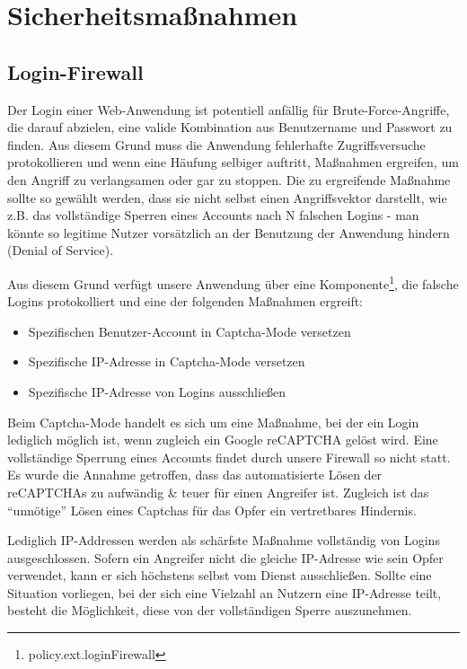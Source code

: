 \documentclass[12pt,DIV14,BCOR10mm,a4paper,parskip=half-,headsepline,headinclude,english,ngerman,bibliography=totocnumbered]{scrreprt}
\begin{document}
\chapter{Sicherheitsmaßnahmen}

\section{Login-Firewall}
Der Login einer Web-Anwendung ist potentiell anfällig für Brute-Force-Angriffe, die darauf abzielen, eine valide Kombination aus Benutzername und Passwort zu finden. Aus diesem Grund muss die Anwendung fehlerhafte Zugriffsversuche protokollieren und wenn eine Häufung selbiger auftritt, Maßnahmen ergreifen, um den Angriff zu verlangsamen oder gar zu stoppen. Die zu ergreifende Maßnahme sollte so gewählt werden, dass sie nicht selbst einen Angriffsvektor darstellt, wie z.B. das vollständige Sperren eines Accounts nach N falschen Logins - man könnte so legitime Nutzer vorsätzlich an der Benutzung der Anwendung hindern (Denial of Service).

Aus diesem Grund verfügt unsere Anwendung über eine Komponente\footnote{policy.ext.loginFirewall}, die falsche Logins protokolliert und eine der folgenden Maßnahmen ergreift:

\begin{itemize}
\item Spezifischen Benutzer-Account in Captcha-Mode versetzen
\item Spezifische IP-Adresse in Captcha-Mode versetzen
\item Spezifische IP-Adresse von Logins ausschließen
\end{itemize}

Beim Captcha-Mode handelt es sich um eine Maßnahme, bei der ein Login lediglich möglich ist, wenn zugleich ein Google reCAPTCHA gelöst wird. Eine vollständige Sperrung eines Accounts findet durch unsere Firewall so nicht statt. Es wurde die Annahme getroffen, dass das automatisierte Lösen der reCAPTCHAs zu aufwändig \& teuer für einen Angreifer ist. Zugleich ist das \enquote{unnötige} Lösen eines Captchas für das Opfer ein vertretbares Hindernis.

Lediglich IP-Addressen werden als schärfste Maßnahme vollständig von Logins ausgeschlossen. Sofern ein Angreifer nicht die gleiche IP-Adresse wie sein Opfer verwendet, kann er sich höchstens selbst vom Dienst ausschließen. Sollte eine Situation vorliegen, bei der sich eine Vielzahl an Nutzern eine IP-Adresse teilt, besteht die Möglichkeit, diese von der vollständigen Sperre auszunehmen.
\end{document}
